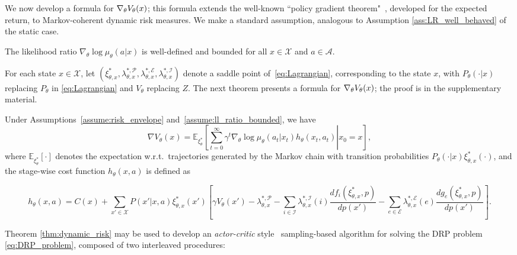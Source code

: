 \documentclass{article} %
\begin{document}
We now develop a formula for $\nabla_{\theta} V_\theta(x)$; this formula extends the well-known ``policy gradient theorem"~\cite{sutton_policy_2000,konda2000actor}, developed for the expected return, to Markov-coherent dynamic risk measures. We make a standard assumption, analogous to Assumption \ref{ass:LR_well_behaved} of the static case.
\begin{assumption}\label{assume:ll_ratio_bounded}
The likelihood ratio $\nabla_\theta\log\mu_\theta(a|x)$ is well-defined and bounded for all $x\in\mathcal X$ and $a\in\mathcal A$.
\end{assumption}
\vspace{-0.1in}
For each state $x\in\mathcal X$, let $(\xi^*_{\theta,x},\lambda^{*,\mathcal P}_{\theta,x},\lambda^{*,\mathcal E}_{\theta,x},\lambda^{*,\mathcal I}_{\theta,x})$ denote a saddle point of~\eqref{eq:Lagrangian}, corresponding to the state $x$, with $P_\theta(\cdot |x)$ replacing $P_\theta$ in \eqref{eq:Lagrangian} and $V_\theta$ replacing $Z$. The next theorem presents a formula for $\nabla_{\theta} V_\theta(x)$; the proof is in the supplementary material.

\begin{theorem}\label{thm:dynamic_risk}
Under Assumptions~\ref{assume:risk_envelope} and~\ref{assume:ll_ratio_bounded}, we have
%
\begin{equation*}
\nabla V_\theta(x) = \mathbb E_{\xi^*_\theta} \left[\left.\sum_{t=0}^{\infty}\gamma^t\nabla_\theta\log\mu_\theta(a_t|x_t)h_\theta(x_t,a_t)\right|  x_0=x\right],
\end{equation*}
%
where $\mathbb E_{\xi^*_\theta}[\cdot]$ denotes the expectation w.r.t.~trajectories generated by the Markov chain with transition probabilities $P_\theta(\cdot|x)\xi_{\theta,x}^*(\cdot)$, and the stage-wise cost function $h_\theta(x,a)$ is defined as
\begin{small}
\begin{equation*}
h_\theta(x,a) \!=\! C(x) + \!\sum_{x'  \in \mathcal X} \!\!P(x'|x,a)\xi^*_{\theta,x}(x')\!\!\left[\gamma V_\theta(x')\!-\!{\lambda}^{*,\mathcal P}_{\theta,x}
\!-\!\sum_{i\in\mathcal I} \!{\lambda}^{*,\mathcal I}_{\theta,x}(i)\frac{ d f_i(\xi^*_{\theta,x},p)}{d p(x')} \!-\! \sum_{e\in\mathcal E}\!{\lambda}^{*,\mathcal E}_{\theta,x}(e) \frac{ d g_e(\xi^*_{\theta,x},p)}{d p(x')}\right]\!\!.
\label{eq:h}
\end{equation*}
\end{small}
\end{theorem}
Theorem \ref{thm:dynamic_risk} may be used to develop an \emph{actor-critic} style~\cite{sutton_policy_2000,konda2000actor} sampling-based algorithm for solving the DRP problem \eqref{eq:DRP_problem}, composed of two interleaved procedures:
\end{document}
